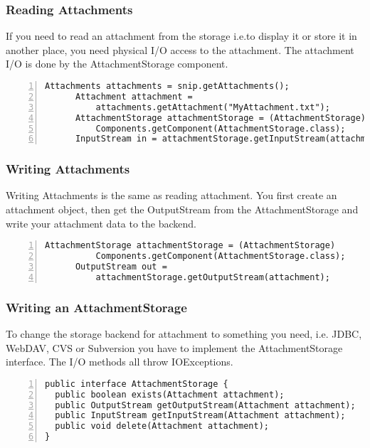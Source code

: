 \documentclass[a4paper,pdftex]{article}
\begin{document}
\subsubsection{Reading Attachments}

If you need to read an attachment from  the storage i.e.to display it or store it in another place, you need physical I/O access to the attachment. The attachment I/O is done by the AttachmentStorage component.

\begin{Verbatim}[gobble=6,frame=single,numbers=left,fontsize=\small]
      Attachments attachments = snip.getAttachments();
      Attachment attachment =
          attachments.getAttachment("MyAttachment.txt");
      AttachmentStorage attachmentStorage = (AttachmentStorage)
          Components.getComponent(AttachmentStorage.class);
      InputStream in = attachmentStorage.getInputStream(attachment);
\end{Verbatim}

\subsubsection{Writing Attachments}

Writing Attachments is the same as reading attachment. You first create an attachment object,
then get the OutputStream from the AttachmentStorage and write your attachment data to the
backend.

\begin{Verbatim}[gobble=6,frame=single,numbers=left,fontsize=\small]
      AttachmentStorage attachmentStorage = (AttachmentStorage)
          Components.getComponent(AttachmentStorage.class);
      OutputStream out =
          attachmentStorage.getOutputStream(attachment);
\end{Verbatim}

\subsubsection{Writing an AttachmentStorage}

To change the storage backend for attachment to something you need, i.e. JDBC, WebDAV, CVS or Subversion
you have to implement the AttachmentStorage interface. The I/O methods all throw IOExceptions.

\begin{Verbatim}[gobble=0,frame=single,numbers=left,fontsize=\small]
public interface AttachmentStorage {
  public boolean exists(Attachment attachment);
  public OutputStream getOutputStream(Attachment attachment);
  public InputStream getInputStream(Attachment attachment);
  public void delete(Attachment attachment);
}
\end{Verbatim}
\end{document}
